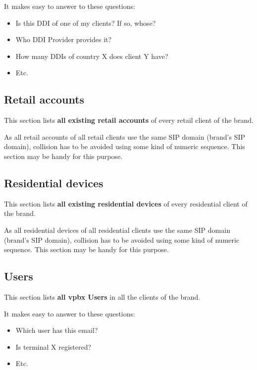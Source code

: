 \documentclass[letterpaper,10pt,english]{sphinxmanual}
\begin{document}
It makes easy to answer to these questions:
\begin{itemize}
\item {} 
Is this DDI of one of my clients? If so, whose?

\item {} 
Who DDI Provider provides it?

\item {} 
How many DDIs of country X does client Y have?

\item {} 
Etc.

\end{itemize}


\subsection{Retail accounts}
\label{administration_portal/brand/views/retail_accounts::doc}\label{administration_portal/brand/views/retail_accounts:retail-accounts}
This section lists \textbf{all existing retail accounts} of every retail client of the brand.

As all retail accounts of all retail clients use the same SIP domain (brand's SIP domain), collision has to be
avoided using some kind of numeric sequence. This section may be handy for this purpose.


\subsection{Residential devices}
\label{administration_portal/brand/views/residential_devices::doc}\label{administration_portal/brand/views/residential_devices:residential-devices}
This section lists \textbf{all existing residential devices} of every residential client of the brand.

As all residential devices of all residential clients use the same SIP domain (brand's SIP domain), collision has to be
avoided using some kind of numeric sequence. This section may be handy for this purpose.


\subsection{Users}
\label{administration_portal/brand/views/users::doc}\label{administration_portal/brand/views/users:users}
This section lists \textbf{all vpbx Users} in all the clients of the brand.

It makes easy to answer to these questions:
\begin{itemize}
\item {} 
Which user has this email?

\item {} 
Is terminal X registered?

\item {} 
Etc.

\end{itemize}
\end{document}
